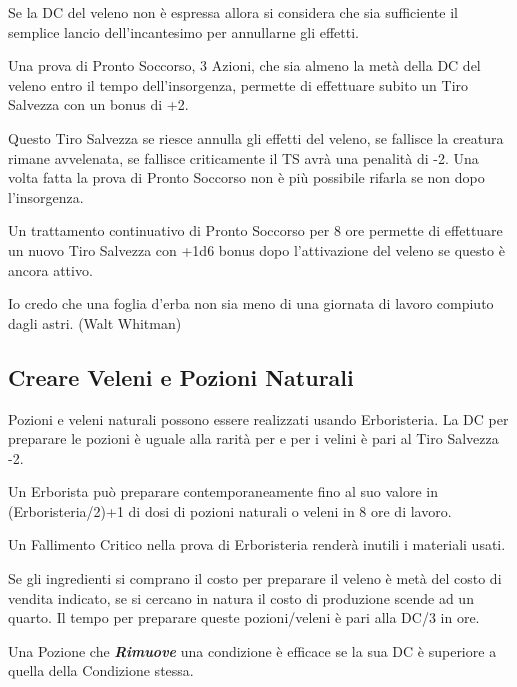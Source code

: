 \begin{multicols}{2}
Se la DC del veleno non è espressa allora si considera che sia sufficiente il semplice lancio dell'incantesimo per annullarne gli effetti.

Una prova di Pronto Soccorso, 3 Azioni, che sia almeno la metà della DC del veleno entro il tempo dell'insorgenza, permette di effettuare subito un Tiro Salvezza con un bonus di +2.

Questo Tiro Salvezza se riesce annulla gli effetti del veleno, se fallisce la creatura rimane avvelenata, se fallisce criticamente il TS avrà una penalità di -2.
Una volta fatta la prova di Pronto Soccorso non è più possibile rifarla se non dopo l'insorgenza.

Un trattamento continuativo di Pronto Soccorso per 8 ore permette di effettuare un nuovo Tiro Salvezza con +1d6 bonus dopo l'attivazione del veleno se questo è ancora attivo.

\medskip

\begin{enfasi}{
Io credo che una foglia d'erba non sia meno di una giornata di lavoro compiuto dagli astri. (Walt Whitman)}
\end{enfasi}

\subsection{Creare Veleni e Pozioni Naturali}\label{crearevelenonaturale}

Pozioni e veleni naturali possono essere realizzati usando Erboristeria. La DC per preparare le pozioni è uguale alla rarità per e per i velini è pari al Tiro Salvezza -2.

Un Erborista può preparare contemporaneamente fino al suo valore in (Erboristeria/2)+1 di dosi di pozioni naturali o veleni in 8 ore di lavoro.

Un Fallimento Critico nella prova di Erboristeria renderà inutili i materiali usati.

Se gli ingredienti si comprano il costo per preparare il veleno è metà del costo di vendita indicato, se si cercano in natura il costo di produzione scende ad un quarto. Il tempo per preparare queste pozioni/veleni è pari alla DC/3 in ore.

Una Pozione che \emph{\textbf{Rimuove}} una condizione è efficace se la sua DC è superiore a quella della Condizione stessa. 


\end{multicols}
